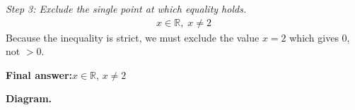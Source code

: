 \documentclass[11pt]{article}
\begin{document}
\textit{Step 3: Exclude the single point at which equality holds.}
\[\begin{gathered}
x \in \mathbb{R}, \; x \neq 2
\end{gathered}\]
Because the inequality is strict, we must exclude the value \( x = 2 \) which gives \( 0 \), not \( > 0 \).

\begin{answerbox}
\textbf{Final answer:}\quad \(\displaystyle x \in \mathbb{R}\), \(\displaystyle x \neq 2\)
\end{answerbox}
\textbf{Diagram.}

\begin{center}
\end{center}
\end{document}
